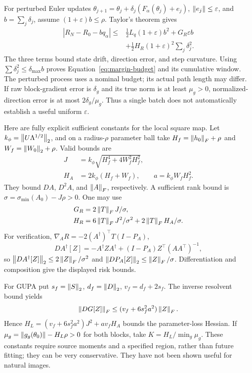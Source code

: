 For perturbed Euler updates $\theta_{j+1}=\theta_j+\delta_j(F_\alpha(\theta_j)+e_j)$, $\left\lVert e_j\right\rVert\le\varepsilon$, and $b=\sum_j\delta_j$, assume $(1+\varepsilon)b\le\rho$. Taylor's theorem gives
\begin{align}
 |R_N-R_0-bq_\alpha|\le{}&\tfrac12L_q(1+\varepsilon)b^2
 +G_R\varepsilon b\\
 &+\tfrac12H_R(1+\varepsilon)^2\sum_j\delta_j^2.\nonumber
\end{align}
The three terms bound state drift, direction error, and step curvature. Using $\sum\delta_j^2\le\delta_{\max}b$ proves Equation~\eqref{eq:margin-budget} and its cumulative window. The perturbed process uses a nominal budget; its actual path length may differ. If raw block-gradient error is $\delta_g$ and its true norm is at least $\mu_g>0$, normalized-direction error is at most $2\delta_g/\mu_g$. Thus a single batch does not automatically establish a useful uniform $\varepsilon$.

Here are fully explicit sufficient constants for the local square map. Let $k_\phi=\left\lVert U\Lambda^{1/2}\right\rVert_2$, and on a radius-$\rho$ parameter ball take $H_f=\left\lVert h_0\right\rVert_F+\rho$ and $W_f=\left\lVert W_0\right\rVert_2+\rho$. Valid bounds are
\begin{align}
 J&=k_\phi\sqrt{H_f^4+4W_f^2H_f^2},\\
 H_A&=2k_\phi(H_f+W_f),\qquad a=k_\phi W_fH_f^2.
\end{align}
They bound $DA$, $D^2A$, and $\left\lVert A\right\rVert_F$, respectively. A sufficient rank bound is $\sigma=\sigma_{\min}(A_0)-J\rho>0$. One may use
\begin{align}
 G_R&=2\left\lVert T\right\rVert_FJ/\sigma,\\
 H_R&=6\left\lVert T\right\rVert_FJ^2/\sigma^2+2\left\lVert T\right\rVert_FH_A/\sigma.
\end{align}
For verification, $\nabla_AR=-2(A^\dagger)^\top T(I-P_A)$,
\begin{equation}
 DA^\dagger[Z]=-A^\dagger ZA^\dagger
 +(I-P_A)Z^\top(AA^\top)^{-1},
\end{equation}
so $\left\lVert DA^\dagger[Z]\right\rVert_2\le2\left\lVert Z\right\rVert_F/\sigma^2$ and $\left\lVert DP_A[Z]\right\rVert_2\le\left\lVert Z\right\rVert_F/\sigma$. Differentiation and composition give the displayed risk bounds.

For GUPA put $s_f=\left\lVert S\right\rVert_2$, $d_f=\left\lVert D\right\rVert_2$, $v_f=d_f+2s_f$. The inverse resolvent bound yields
\begin{equation}
 \left\lVert DG[Z]\right\rVert_F\le(v_f+6s_f^2a^2)\left\lVert Z\right\rVert_F.
\end{equation}
Hence $H_L=(v_f+6s_f^2a^2)J^2+av_fH_A$ bounds the parameter-loss Hessian. If $\mu_g=\left\lVert g_g(\theta_0)\right\rVert-H_L\rho>0$ for both blocks, take $K=H_L/\min_g\mu_g$. These constants require source moments and a specified region, rather than future fitting; they can be very conservative. They have not been shown useful for natural images.

